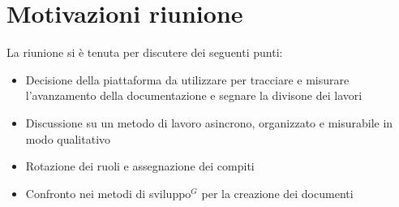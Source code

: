 \documentclass[a4paper,10pt]{article}
\begin{document}
\section*{Motivazioni riunione}
La riunione si è tenuta per discutere dei seguenti punti:
\begin{itemize}
    \item Decisione della piattaforma da utilizzare per tracciare e misurare l'avanzamento della documentazione e segnare la divisone dei lavori
    \par
    \item Discussione su un metodo di lavoro asincrono, organizzato e misurabile in modo qualitativo
    \par
    \item Rotazione dei ruoli e assegnazione dei compiti
    \par
    \item Confronto nei metodi di sviluppo$^G$ per la creazione dei documenti
\end{itemize}
\newpage
\end{document}
